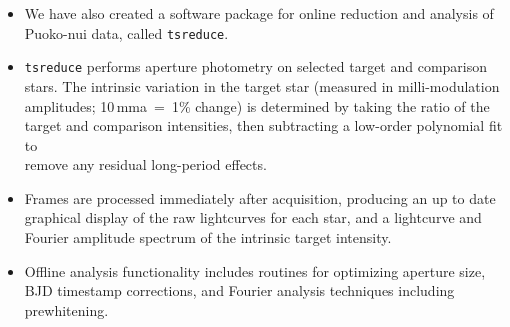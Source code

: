 \vspace{-1.75cm}
\begin{itemize}[itemsep=20pt]
\item[] We have also created a software package for online reduction and analysis
of Puoko-nui data, called \texttt{tsreduce}.


\item[] \texttt{tsreduce} performs aperture photometry on selected target and
comparison stars. The intrinsic variation in the target star (measured in
milli-modulation amplitudes; 10\,mma~=~1\% change) is determined by taking the
ratio of the target and comparison intensities, then subtracting a low-order 
polynomial fit to\\remove any residual long-period effects.

\item[] Frames are processed immediately after acquisition, producing an up to date
graphical display of the raw lightcurves for each star, and a lightcurve and Fourier
amplitude spectrum of the intrinsic target intensity.

\item[] Offline analysis functionality includes routines for optimizing aperture size,
BJD timestamp corrections, and Fourier analysis techniques including prewhitening.


\end{itemize}
\vspace{-1.75cm}